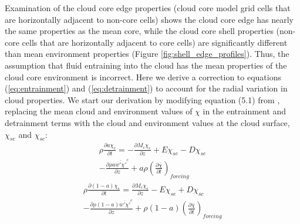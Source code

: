 \documentclass[12pt]{article}
\begin{document}
Examination of the cloud core edge properties (cloud core model grid cells 
that are horizontally adjacent to non-core cells) shows the cloud core edge has 
nearly the same properties as the mean core, while the cloud core shell 
properties (non-core cells that are horizontally adjacent to core cells) 
are significantly different than mean environment properties (Figure 
\ref{fig:shell_edge_profiles}).  Thus, the assumption that fluid entraining
into the cloud has the mean properties of the cloud core environment is 
incorrect.  Here we derive a correction to equations (\ref{eq:entrainment}) and 
(\ref{eq:detrainment}) to account for the radial variation in cloud properties. 
We start our derivation by modifying equation (5.1) from \cite{Siebesma1995},
replacing the mean cloud and environment values of $\chi$ in the entrainment 
and detrainment terms with the cloud and environment values at the cloud 
surface, $\chi_{se}$ and $\chi_{sc}$:
\begin{equation}
  \label{eq:derivation_entrainment}
  \begin{split}
    \rho \frac{\partial a \chi_c}{\partial t} 
    = - \frac{\partial M_c \chi_c}{\partial z} 
    + E \chi_{se} - D \chi_{sc} \\
    - \frac{\partial \rho a \overline{w' \chi'}^c}{\partial z} 
    + a \rho \left(\frac{\partial \bar{\chi}}{\partial t}\right)_{forcing}
  \end{split}
\end{equation}
\begin{equation}
  \label{eq:derivation_detrainment}
  \begin{split}
    \rho \frac{\partial (1 - a) \chi_e}{\partial t}
    = \frac{\partial M_c \chi_e}{\partial z} 
    - E \chi_{se} + D \chi_{sc} \\
    - \frac{\partial \rho (1 - a) \overline{w' \chi'}^e}{\partial z} 
    + \rho (1 - a) \left(\frac{\partial \bar{\chi}}{\partial t}\right)_{forcing}
  \end{split}
\end{equation}
\end{document}
